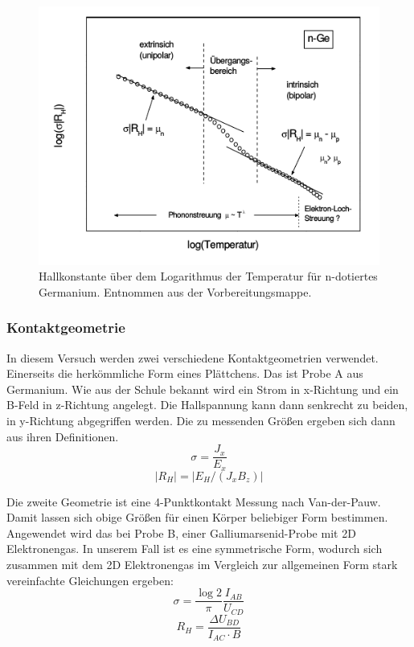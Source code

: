 \begin{figure}
\centering
\includegraphics[scale=0.6]{./chap/Hallc_logTemp.png}
\caption{Hallkonstante über dem Logarithmus der Temperatur für n-dotiertes Germanium. Entnommen aus der Vorbereitungsmappe.}
\end{figure}

\subsubsection{Kontaktgeometrie}
In diesem Versuch werden zwei verschiedene Kontaktgeometrien verwendet.\\
Einerseits die herkömmliche Form eines Plättchens. Das ist Probe A aus Germanium. Wie aus der Schule bekannt wird ein Strom in x-Richtung und ein B-Feld in z-Richtung angelegt. Die Hallspannung kann dann senkrecht zu beiden, in y-Richtung abgegriffen werden. Die zu messenden Größen ergeben sich dann aus ihren Definitionen.
$$\sigma = \frac{J_x}{E_x}$$
$$\vert R_H \vert = \vert E_H/(J_x B_z) \vert$$

Die zweite Geometrie ist eine 4-Punktkontakt Messung nach Van-der-Pauw. Damit lassen sich obige Größen für einen Körper beliebiger Form bestimmen. \\
Angewendet wird das bei Probe B, einer Galliumarsenid-Probe mit 2D Elektronengas. In unserem Fall ist es eine symmetrische Form, wodurch sich zusammen mit dem 2D Elektronengas im Vergleich zur allgemeinen Form stark vereinfachte Gleichungen ergeben:
$$\sigma = \frac{\log 2}{\pi} \frac{I_{AB}}{U_{CD}} $$
$$R_H = \frac{\Delta U_{BD}}{I_{AC} \cdot B} $$

